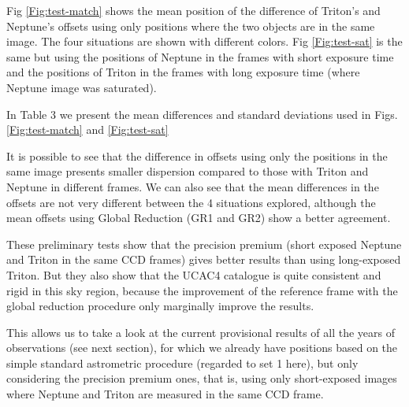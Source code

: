 \documentclass[12pt,a4paper]{report}
\begin{document}
Fig \ref{Fig:test-match} shows the mean position of the difference of Triton's and Neptune's offsets using only positions where the two objects are in the same image. The four situations are shown with different colors. Fig \ref{Fig:test-sat} is the same but using the positions of Neptune in the frames with short exposure time and the positions of Triton in the frames with long exposure time (where Neptune image was saturated).

In Table 3 we present the mean differences and standard deviations used in Figs. \ref{Fig:test-match} and \ref{Fig:test-sat}

It is possible to see that the difference in offsets using only the positions in the same image presents smaller dispersion compared to those with Triton and Neptune in different frames. We can also see that the mean differences in the offsets are not very different between the 4 situations explored, although the mean offsets using Global Reduction (GR1 and GR2) show a better agreement.

These preliminary tests show that the precision premium (short exposed Neptune and Triton in the same CCD frames) gives better results than using long-exposed Triton. But they also show that the UCAC4 catalogue is quite consistent and rigid in this sky region, because the improvement of the reference frame with the global reduction procedure only marginally improve the results.
 

This allows us to take a look at the current provisional results of all the years of observations (see next section), for which we already have positions based on the simple standard astrometric procedure (regarded to set 1 here), but only considering the precision premium ones, that is, using only short-exposed images where Neptune and Triton are measured in the same CCD frame.
\end{document}
